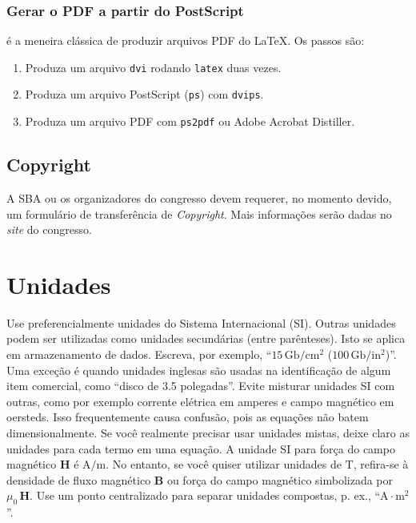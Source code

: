 \documentclass[a4paper]{ifacconf}
\begin{document}
\subsubsection{Gerar o PDF a partir do PostScript} 
é a meneira clássica de produzir arquivos PDF do \LaTeX. Os passos são: 


\begin{enumerate}
  \item Produza um arquivo \texttt{dvi} rodando \texttt{latex} duas vezes. 
  \item Produza um arquivo PostScript (\texttt{ps}) com \texttt{dvips}.
  \item Produza um arquivo PDF com \texttt{ps2pdf} ou Adobe Acrobat
  Distiller.
\end{enumerate}

\subsection{Copyright}

A SBA ou os organizadores do congresso devem requerer, no momento devido, 
um formulário de transferência de {\em Copyright}. Mais informações serão
dadas no {\em site} do congresso.


\section{Unidades}

Use preferencialmente unidades do Sistema Internacional (SI). Outras unidades
podem ser utilizadas como unidades secundárias (entre parênteses). Isto se aplica
em armazenamento de dados. Escreva,
por exemplo,  ``$15\,\mathrm{Gb}/\mathrm{cm}^2$ ($100\,\mathrm{Gb}/\mathrm{in}^2$)''. 
Uma exceção é quando unidades inglesas são usadas na identificação de algum item
comercial, como ``disco de 3.5 polegadas''. Evite misturar unidades SI com outras, 
como por exemplo corrente elétrica em amperes e campo magnético em oersteds. 
Isso frequentemente causa confusão, pois as equações não batem dimensionalmente. 
Se você realmente precisar usar unidades mistas, deixe claro as unidades para cada
termo em uma equação. A unidade SI para força do campo magnético 
$\mathbf{H}$ é $\mathrm{A}/\mathrm{m}$. No entanto, se você quiser utilizar unidades
de  $\mathrm{T}$, 
refira-se à densidade de fluxo magnético $\mathbf{B}$ ou
força do campo magnético simbolizada por $\mu_0\,\mathbf{H}$. 
Use um ponto centralizado para separar unidades compostas, p. ex.,  
``$\mathrm{A} \cdot \mathrm{m}^2$''.
\end{document}

